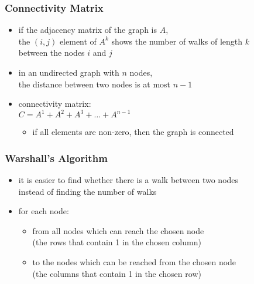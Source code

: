\documentclass[dvipsnames]{beamer}
\begin{document}
\begin{frame}
  \frametitle{Connectivity Matrix}

  \begin{itemize}
    \item if the adjacency matrix of the graph is $A$,\\
      the $(i,j)$ element of $A^k$ shows the number of walks of length $k$\\
      between the nodes $i$ and $j$

    \pause
    \item in an undirected graph with $n$ nodes,\\
      the distance between two nodes is at most $n-1$

    \pause
    \medskip
    \item \alert{connectivity matrix}:\\
      $C = A^1 + A^2 + A^3 + \dots + A^{n-1}$
    \begin{itemize}
      \item if all elements are non-zero, then the graph is connected
    \end{itemize}
  \end{itemize}
\end{frame}

\begin{frame}
  \frametitle{Warshall's Algorithm}

  \begin{itemize}
    \item it is easier to find whether there is a walk between two nodes\\
      instead of finding the number of walks

    \pause
    \medskip
    \item for each node:
    \begin{itemize}
      \item from all nodes which can reach the chosen node\\
        (the rows that contain 1 in the chosen column)

      \item to the nodes which can be reached from the chosen node\\
        (the columns that contain 1 in the chosen row)
    \end{itemize}
  \end{itemize}
\end{frame}
\end{document}
